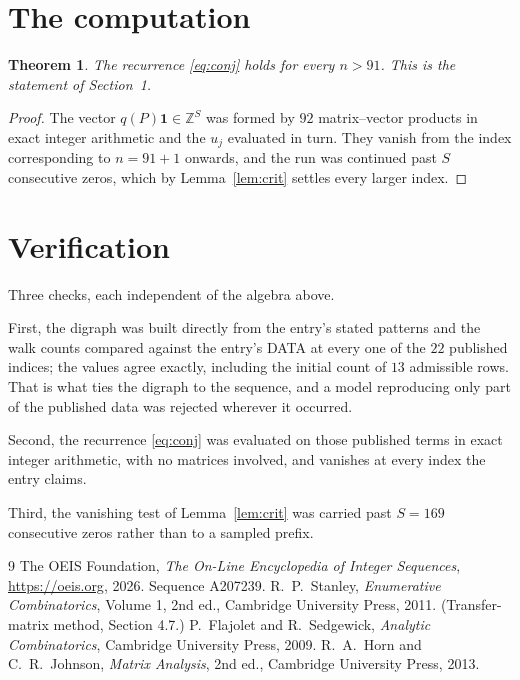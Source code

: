 \documentclass[11pt,a4paper]{article}
\theoremstyle{plain}
\newtheorem{theorem}{Theorem}
\theoremstyle{definition}
\begin{document}
\section{The computation}

\begin{theorem}
The recurrence \eqref{eq:conj} holds for every $n>91$. This is the statement of
Section~1.
\end{theorem}

\begin{proof}
The vector $q(P)\mathbf{1}\in\mathbb{Z}^{S}$ was formed by $92$ matrix--vector
products in exact integer arithmetic and the $u_j$ evaluated in turn. They vanish from the
index corresponding to $n=91+1$ onwards, and the run was continued past $S$ consecutive
zeros, which by Lemma~\ref{lem:crit} settles every larger index.
\end{proof}

\section{Verification}

Three checks, each independent of the algebra above.

First, the digraph was built directly from the entry's stated patterns and the walk counts
compared against the entry's DATA at every one of the $22$ published indices; the
values agree exactly, including the initial count of $13$ admissible rows. That is
what ties the digraph to the sequence, and a model reproducing only part of the published
data was rejected wherever it occurred.

Second, the recurrence \eqref{eq:conj} was evaluated on those published terms in exact
integer arithmetic, with no matrices involved, and vanishes at every index the entry claims.

Third, the vanishing test of Lemma~\ref{lem:crit} was carried past $S=169$ consecutive
zeros rather than to a sampled prefix.

\begin{thebibliography}{9}
 The OEIS Foundation, \emph{The On-Line Encyclopedia of Integer
Sequences}, \url{https://oeis.org}, 2026. Sequence A207239.
 R.~P.~Stanley, \emph{Enumerative Combinatorics}, Volume 1, 2nd ed.,
Cambridge University Press, 2011. (Transfer-matrix method, Section 4.7.)
 P.~Flajolet and R.~Sedgewick, \emph{Analytic Combinatorics}, Cambridge
University Press, 2009.
 R.~A.~Horn and C.~R.~Johnson, \emph{Matrix Analysis}, 2nd ed., Cambridge
University Press, 2013.
\end{thebibliography}
\end{document}
